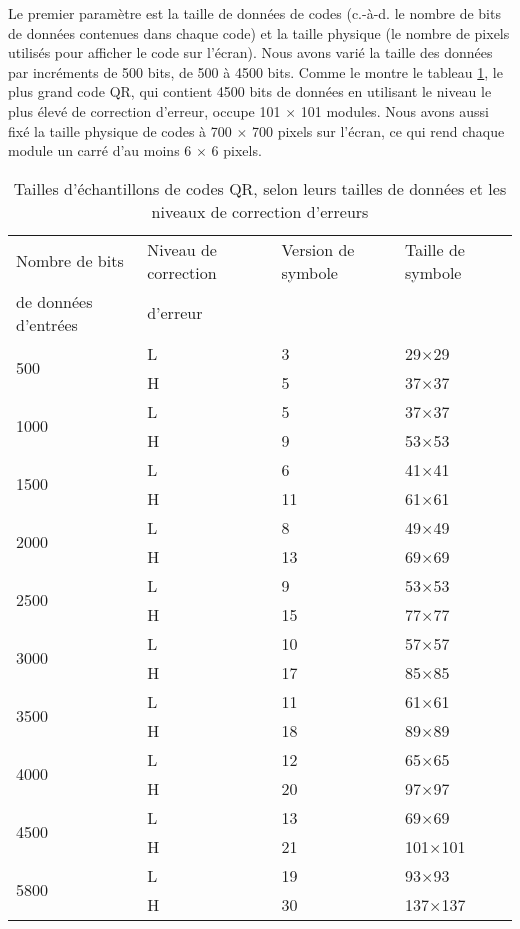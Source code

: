 Le premier paramètre est la taille de données de codes (c.-à-d. le nombre de bits de données contenues dans chaque code) et la taille physique (le nombre de pixels utilisés pour afficher le code sur l'écran). Nous avons varié la taille des données par incréments de 500 bits, de 500 à 4500 bits. Comme le montre le tableau \ref{tab:qr:sample-sizes}, le plus grand code QR, qui contient 4500 bits de données en utilisant le niveau le plus élevé de correction d'erreur, occupe 101 $\times$ 101 modules. Nous avons aussi fixé la taille physique de codes à 700 $\times$ 700 pixels sur l'écran, ce qui rend chaque module un carré d'au moins 6 $\times$ 6 pixels.

\begin{table}[ht]
\begin{center}
\begin{tabular}{llll}
Nombre de bits & Niveau de correction & Version de symbole & Taille de symbole \\
de données d'entrées & d'erreur & & \\
\hline
\multirow{2}{*}{500} & L & 3 & 29$\times$29\\
& H & 5 & 37$\times$37\\
\hline
\multirow{2}{*}{1000} & L & 5 & 37$\times$37\\
& H & 9 & 53$\times$53\\
\hline
\multirow{2}{*}{1500} & L & 6 & 41$\times$41\\
& H & 11 & 61$\times$61\\
\hline
\multirow{2}{*}{2000} & L & 8 & 49$\times$49\\
& H & 13 & 69$\times$69\\
\hline
\multirow{2}{*}{2500} & L & 9 & 53$\times$53\\
& H & 15 & 77$\times$77\\
\hline
\multirow{2}{*}{3000} & L & 10 & 57$\times$57\\
& H & 17 & 85$\times$85\\
\hline
\multirow{2}{*}{3500} & L & 11 & 61$\times$61\\
& H & 18 & 89$\times$89\\
\hline
\multirow{2}{*}{4000} & L & 12 & 65$\times$65\\
& H & 20 & 97$\times$97\\
\hline
\multirow{2}{*}{4500} & L & 13 & 69$\times$69\\
& H & 21 & 101$\times$101\\
\hline
\multirow{2}{*}{5800} & L & 19 & 93$\times$93\\
& H & 30 & 137$\times$137\\
\hline\end{tabular}
\caption[Tailles d'échantillons]{Tailles d'échantillons de codes QR, selon leurs tailles de données et les niveaux de correction d'erreurs \citep{iso18004}}
\label{tab:qr:sample-sizes}
\end{center}
\end{table}

